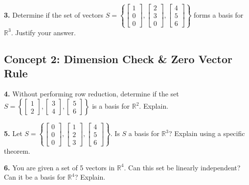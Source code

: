 \documentclass[11pt]{article}
\begin{document}
\vspace{0.5cm}
\textbf{3.} Determine if the set of vectors $S = \left\{ \begin{bmatrix} 1 \\ 0 \\ 0 \end{bmatrix}, \begin{bmatrix} 2 \\ 3 \\ 0 \end{bmatrix}, \begin{bmatrix} 4 \\ 5 \\ 6 \end{bmatrix} \right\}$ forms a basis for $\mathbb{R}^3$. Justify your answer.

\subsection*{Concept 2: Dimension Check \& Zero Vector Rule}
\textbf{4.} Without performing row reduction, determine if the set $S = \left\{ \begin{bmatrix} 1 \\ 2 \end{bmatrix}, \begin{bmatrix} 3 \\ 4 \end{bmatrix}, \begin{bmatrix} 5 \\ 6 \end{bmatrix} \right\}$ is a basis for $\mathbb{R}^2$. Explain.

\vspace{0.5cm}
\textbf{5.} Let $S = \left\{ \begin{bmatrix} 0 \\ 0 \\ 0 \end{bmatrix}, \begin{bmatrix} 1 \\ 2 \\ 3 \end{bmatrix}, \begin{bmatrix} 4 \\ 5 \\ 6 \end{bmatrix} \right\}$. Is $S$ a basis for $\mathbb{R}^3$? Explain using a specific theorem.

\vspace{0.5cm}
\textbf{6.} You are given a set of 5 vectors in $\mathbb{R}^4$. Can this set be linearly independent? Can it be a basis for $\mathbb{R}^4$? Explain.
\end{document}
